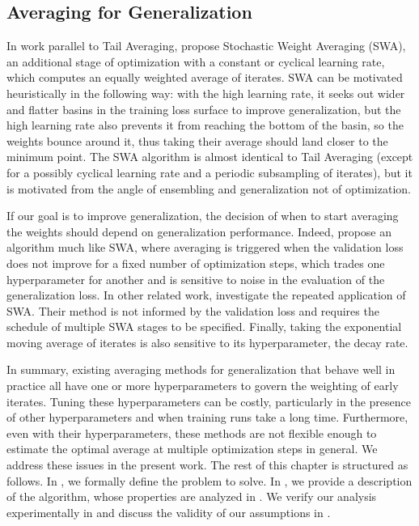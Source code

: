 \documentclass[twocolumn]{article}
\begin{document}
\subsection{Averaging for Generalization}

In work parallel to Tail Averaging, \citet{izmailov2018averaging} propose Stochastic Weight Averaging (SWA), an additional stage of optimization with a constant or cyclical learning rate, which computes an equally weighted average of iterates.
SWA can be motivated heuristically in the following way:
with the high learning rate, it seeks out wider and flatter basins in the training loss surface to improve generalization, but the high learning rate also prevents it from reaching the bottom of the basin, so the weights bounce around it, thus taking their average should land closer to the minimum point.
The SWA algorithm is almost identical to Tail Averaging (except for a possibly cyclical learning rate and a periodic subsampling of iterates), but it is motivated from the angle of ensembling and generalization not of optimization.

If our goal is to improve generalization, the decision of when to start averaging the weights should depend on generalization performance.
Indeed, \cite{merity2017regularizing} propose an algorithm much like SWA, where averaging is triggered when the validation loss does not improve for a fixed number of optimization steps, which trades one hyperparameter for another and is sensitive to noise in the evaluation of the generalization loss.
In other related work, \citet{guo2022stochastic} investigate the repeated application of SWA.
Their method is not informed by the validation loss and requires the schedule of multiple SWA stages to be specified.
Finally, taking the exponential moving average of iterates is also sensitive to its hyperparameter, the decay rate.

In summary, existing averaging methods for generalization that behave well in practice all have one or more hyperparameters to govern the weighting of early iterates.
Tuning these hyperparameters can be costly, particularly in the presence of other hyperparameters and when training runs take a long time.
Furthermore, even with their hyperparameters, these methods are not flexible enough to estimate the optimal average at multiple optimization steps in general.
We address these issues in the present work.
The rest of this chapter is structured as follows.
In , we formally define the problem to solve.
In , we provide a description of the algorithm, whose properties are analyzed in .
We verify our analysis experimentally in  and discuss the validity of our assumptions in .
\end{document}
